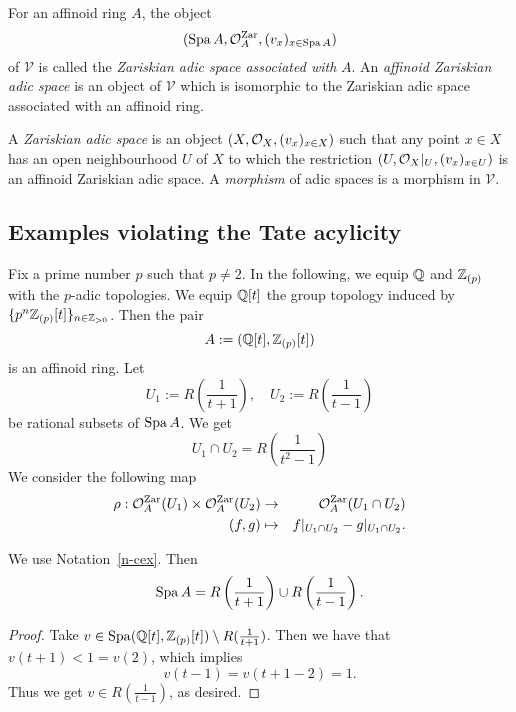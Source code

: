 \begin{dfn}\label{d-zar-adic-sp}
For an affinoid ring $A$, 
the object 
$$({\operatorname{Spa}}\,A, \mathcal{O}_A^{{\operatorname{Zar}}}, (v_x)_{x \in {\operatorname{Spa}}\,A})$$ 
of $\mathcal V$ is called the {\em Zariskian adic space associated with} $A$. 
An {\em affinoid Zariskian adic space} is an object of $\mathcal V$ 
which is isomorphic to the Zariskian adic space associated with an affinoid ring. 

A {\em Zariskian adic space} is an object $(X, \mathcal{O}_X, (v_x)_{x \in X})$ 
such that any point $x \in X$ has an open neighbourhood $U$ of $X$ 
to which the restriction $(U, \mathcal{O}_X|_U, (v_x)_{x \in U})$ is 
an affinoid Zariskian adic space. 
A {\em morphism} of adic spaces is a morphism in $\mathcal V$. 
\end{dfn}




\subsection{Examples violating the Tate acylicity}\label{ss-cex-Tate}



\begin{nota}\label{n-cex}
Fix a prime number $p$ such that $p \neq 2$. 
In the following, we equip $\mathbb{Q}$ and $\mathbb{Z}_{(p)}$ 
with the $p$-adic topologies. 
We equip $\mathbb{Q}[t]$ the group topology induced by $\{p^n\mathbb{Z}_{(p)}[t]\}_{n \in \mathbb{Z}_{>0}}$. 
Then the pair
$$A:=(\mathbb{Q}[t], \mathbb{Z}_{(p)}[t])$$
is an affinoid ring.  
Let 
$$U_1:=R\left(\frac{1}{t+1}\right), \quad U_2:=R\left(\frac{1}{t-1}\right)$$
be rational subsets of ${\operatorname{Spa}}\,A$. 
We get 
$$U_1 \cap U_2=R\left(\frac{1}{t^2-1}\right)$$
We consider the following map 
\begin{eqnarray*}
\rho: \mathcal{O}_A^{{\operatorname{Zar}}}(U_1) \times \mathcal{O}_A^{{\operatorname{Zar}}}(U_2) &\to & 
\mathcal{O}_A^{{\operatorname{Zar}}}(U_1 \cap U_2)\\
(f, g)&\mapsto &f|_{U_1 \cap U_2}-g|_{U_1 \cap U_2}.
\end{eqnarray*}
\end{nota}

\begin{lem}\label{l-cex-cover}
We use Notation~\ref{n-cex}. 
Then 
$${\operatorname{Spa}}\,A=R\left(\frac{1}{t+1}\right) 
\cup R\left(\frac{1}{t-1}\right).$$ 
\end{lem}

\begin{proof}
Take $v \in {\operatorname{Spa}}(\mathbb{Q}[t], \mathbb{Z}_{(p)}[t]) \setminus R(\frac{1}{t+1})$. 
Then we have that $v(t+1) < 1=v(2)$, which implies 
$$v(t-1)=v(t+1-2)=1.$$
Thus we get $v \in R(\frac{1}{t-1})$, as desired. 
\end{proof}


